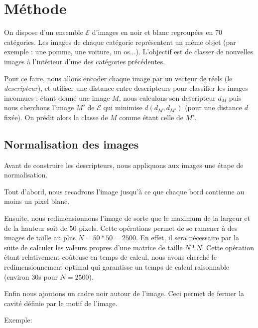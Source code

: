 \documentclass[a4paper,10pt]{article} %
\theoremstyle{definition} %
\begin{document}
\section{Méthode}

On dispose d'un ensemble $\mathcal{E}$ d'images en noir et blanc regroupées en 70 catégories. Les images de chaque catégorie représentent un même objet (par exemple : une pomme, une voiture, un os...). L'objectif est de classer de nouvelles images à l'intérieur d'une des catégories précédentes.

Pour ce faire, nous allons encoder chaque image par un vecteur de réels (le \textit{descripteur}), et utiliser une distance entre descripteurs pour classifier les images inconnues : étant donné une image $M$, nous calculons son descripteur $d_M$ puis nous cherchons l'image $M'$ de $\mathcal{E}$ qui minimise $d(d_M, d_{M'})$ (pour une distance $d$ fixée). On prédit alors la classe de $M$ comme étant celle de $M'$.


\subsection{Normalisation des images}

Avant de construire les descripteurs, nous appliquons aux images une étape de normalisation.

Tout d'abord, nous recadrons l'image jusqu'à ce que chaque bord contienne au moins un pixel blanc.

Ensuite, nous redimensionnons l'image de sorte que le maximum de la largeur et de la hauteur soit de 50 pixels. Cette opérations permet de se ramener à des images de taille au plus $N = 50*50 = 2500$. En effet, il sera nécessaire par la suite de calculer les valeurs propres d'une matrice de taille $N*N$. Cette opération étant relativement coûteuse en temps de calcul, nous avons cherché le redimensionnement optimal qui garantisse un temps de calcul raisonnable (environ 30s pour $N = 2500$).

Enfin nous ajoutons un cadre noir autour de l'image. Ceci permet de fermer la cavité définie par le motif de l'image.

Exemple:
\end{document}

